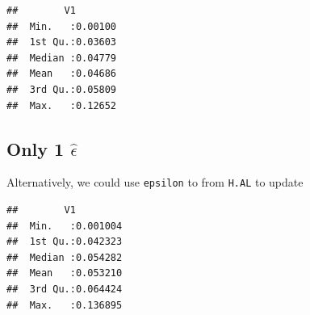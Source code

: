 \documentclass[
]{book}
\newenvironment{Shaded}{\begin{snugshade}}{\end{snugshade}}
\newcommand{\FunctionTok}[1]{\textcolor[rgb]{0.00,0.00,0.00}{#1}}
\newcommand{\NormalTok}[1]{#1}
\newcommand{\OtherTok}[1]{\textcolor[rgb]{0.56,0.35,0.01}{#1}}
\newcommand{\SpecialCharTok}[1]{\textcolor[rgb]{0.00,0.00,0.00}{#1}}
\begin{document}
\begin{Shaded}
\end{Shaded}

\begin{verbatim}
##        V1         
##  Min.   :0.00100  
##  1st Qu.:0.03603  
##  Median :0.04779  
##  Mean   :0.04686  
##  3rd Qu.:0.05809  
##  Max.   :0.12652
\end{verbatim}

\hypertarget{only-1-hatepsilon-1}{%
\subsection{\texorpdfstring{Only 1 \(\hat\epsilon\)}{Only 1 \textbackslash hat\textbackslash epsilon}}\label{only-1-hatepsilon-1}}

Alternatively, we could use \texttt{epsilon} to from \texttt{H.AL} to update

\begin{Shaded}
\end{Shaded}

\begin{verbatim}
##        V1          
##  Min.   :0.001004  
##  1st Qu.:0.042323  
##  Median :0.054282  
##  Mean   :0.053210  
##  3rd Qu.:0.064424  
##  Max.   :0.136895
\end{verbatim}

\begin{Shaded}
\end{Shaded}
\end{document}
